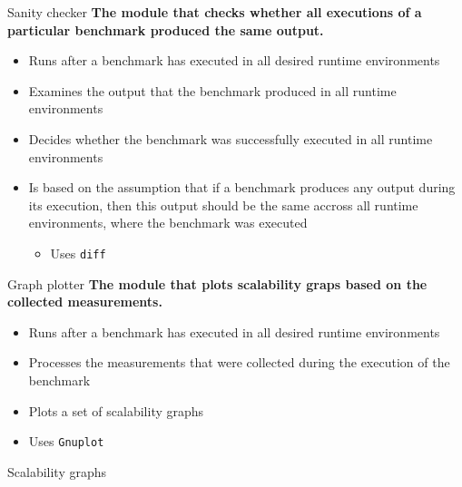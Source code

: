 \documentclass{beamer}
\begin{document}
\begin{frame}[t]{Sanity checker}
	{\bf The module that checks whether all executions of a particular benchmark produced the same output.}
    \begin{itemize}
		\item Runs after a benchmark has executed in all desired runtime environments
		\item Examines the output that the benchmark produced in all runtime environments
		\item Decides whether the benchmark was successfully executed in all runtime environments
		\item Is based on the assumption that if a benchmark produces any output during its execution, then this output should be the same accross all runtime environments, where the benchmark was executed
			\begin{itemize}
				\item Uses \texttt{diff}
			\end{itemize}
    \end{itemize}
\end{frame}

\begin{frame}[t]{Graph plotter}
	{\bf The module that plots scalability graps based on the collected measurements.}
    \begin{itemize}
		\item Runs after a benchmark has executed in all desired runtime environments
		\item Processes the measurements that were collected during the execution of the benchmark
		\item Plots a set of scalability graphs
		\item Uses \texttt{Gnuplot}
    \end{itemize}
\end{frame}

\begin{frame}[t]{Scalability graphs}


\end{frame}
\end{document}
